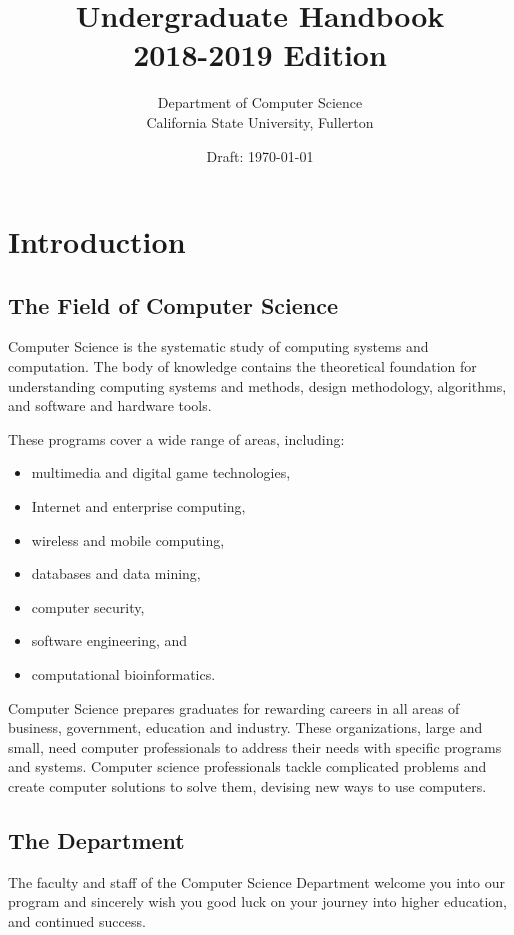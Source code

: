 \documentclass{book}
\begin{document}
\title{Undergraduate Handbook \\ 2018-2019 Edition}
\author{Department of Computer Science \\ California State University, Fullerton}
\date{Draft: \today}
\maketitle

\newpage
\tableofcontents

\chapter{Introduction}

\section{The Field of Computer Science}
Computer Science is the systematic study of computing systems and
computation. The body of knowledge contains the theoretical foundation
for understanding computing systems and methods, design methodology,
algorithms, and software and hardware tools.

These programs cover a wide range of areas, including:
\begin{itemize}
\item multimedia and digital game technologies,
\item Internet and enterprise computing,
\item wireless and mobile computing,
\item databases and data mining,
\item computer security,
\item software engineering, and
\item computational bioinformatics.
\end{itemize}

Computer Science prepares graduates for rewarding careers in all areas
of business, government, education and industry. These organizations,
large and small, need computer professionals to address their needs
with specific programs and systems. Computer science professionals
tackle complicated problems and create computer solutions to solve
them, devising new ways to use computers.

\section{The Department}
\label{section:the_department}
The faculty and staff of the Computer Science Department welcome you
into our program and sincerely wish you good luck on your journey into
higher education, and continued success.
\end{document}
